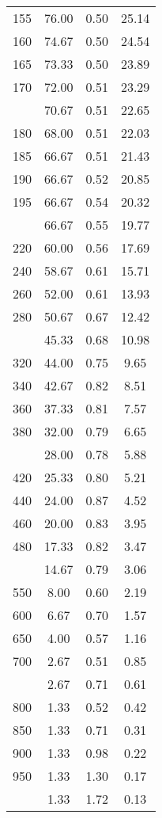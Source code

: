 \begin{table}[ht]
\begin{tabular}{lccc}
  155 & 76.00 & 0.50 & 25.14 \\ 
  160 & 74.67 & 0.50 & 24.54 \\ 
  165 & 73.33 & 0.50 & 23.89 \\ 
  170 & 72.00 & 0.51 & 23.29 \\ 
   \addlinespace
175 & 70.67 & 0.51 & 22.65 \\ 
  180 & 68.00 & 0.51 & 22.03 \\ 
  185 & 66.67 & 0.51 & 21.43 \\ 
  190 & 66.67 & 0.52 & 20.85 \\ 
  195 & 66.67 & 0.54 & 20.32 \\ 
   \addlinespace
200 & 66.67 & 0.55 & 19.77 \\ 
  220 & 60.00 & 0.56 & 17.69 \\ 
  240 & 58.67 & 0.61 & 15.71 \\ 
  260 & 52.00 & 0.61 & 13.93 \\ 
  280 & 50.67 & 0.67 & 12.42 \\ 
   \addlinespace
300 & 45.33 & 0.68 & 10.98 \\ 
  320 & 44.00 & 0.75 & 9.65 \\ 
  340 & 42.67 & 0.82 & 8.51 \\ 
  360 & 37.33 & 0.81 & 7.57 \\ 
  380 & 32.00 & 0.79 & 6.65 \\ 
   \addlinespace
400 & 28.00 & 0.78 & 5.88 \\ 
  420 & 25.33 & 0.80 & 5.21 \\ 
  440 & 24.00 & 0.87 & 4.52 \\ 
  460 & 20.00 & 0.83 & 3.95 \\ 
  480 & 17.33 & 0.82 & 3.47 \\ 
   \addlinespace
500 & 14.67 & 0.79 & 3.06 \\ 
  550 & 8.00 & 0.60 & 2.19 \\ 
  600 & 6.67 & 0.70 & 1.57 \\ 
  650 & 4.00 & 0.57 & 1.16 \\ 
  700 & 2.67 & 0.51 & 0.85 \\ 
   \addlinespace
750 & 2.67 & 0.71 & 0.61 \\ 
  800 & 1.33 & 0.52 & 0.42 \\ 
  850 & 1.33 & 0.71 & 0.31 \\ 
  900 & 1.33 & 0.98 & 0.22 \\ 
  950 & 1.33 & 1.30 & 0.17 \\ 
   \addlinespace
1000 & 1.33 & 1.72 & 0.13 \\ 
   \bottomrule
\end{tabular}
\end{table}
